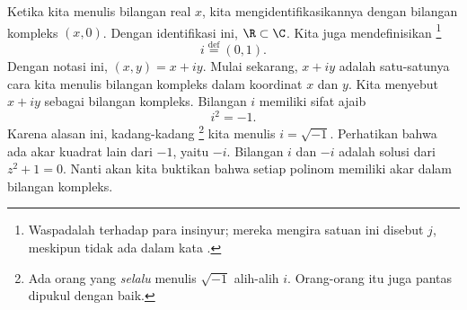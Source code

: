 
Ketika kita menulis bilangan real $x$, kita mengidentifikasikannya dengan
bilangan kompleks $(x,0)$.
Dengan identifikasi ini, $\R \subset \C$.
Kita juga mendefinisikan \emph{}%
\footnote{Waspadalah terhadap para insinyur; mereka mengira satuan ini disebut
$j$, meskipun tidak ada  dalam kata .}%
\begin{equation*}
i \overset{\text{def}}{=} (0,1) .
\end{equation*}
Dengan notasi ini, $(x,y) = x+iy$.
Mulai sekarang, $x+iy$ adalah satu-satunya cara kita menulis bilangan
kompleks dalam koordinat $x$ dan $y$.
Kita menyebut $x+iy$ sebagai \emph{}
bilangan kompleks.
Bilangan $i$ memiliki sifat ajaib
\begin{equation*}
i^2 = -1 .
\end{equation*}
Karena alasan ini, kadang-kadang%
\footnote{Ada orang yang \emph{selalu} menulis $\sqrt{-1}$ alih-alih $i$.
Orang-orang itu juga pantas dipukul dengan baik.}
kita menulis $i = \sqrt{-1}$.
Perhatikan bahwa ada akar kuadrat lain dari $-1$, yaitu $-i$.
Bilangan $i$ dan $-i$ adalah solusi dari $z^2+1=0$.
Nanti akan kita buktikan bahwa setiap polinom memiliki akar dalam bilangan
kompleks.
